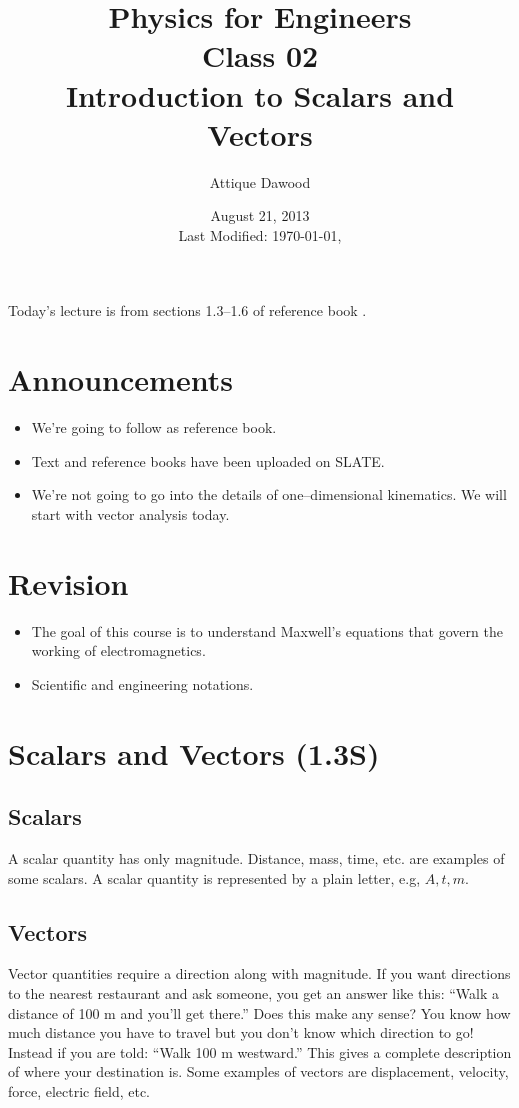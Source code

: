 \documentclass[12pt,a4paper]{article}
\title{\vspace{-2cm}Physics for Engineers\\Class 02\\Introduction to Scalars and Vectors}
\author{Attique Dawood}
\date{August 21, 2013\\[0.2cm] Last Modified: \today, \currenttime}
\begin{document}
\maketitle
Today's lecture is from sections 1.3--1.6 of reference book \cite{Sadiku}.
\section{Announcements}
\begin{itemize}
\item We're going to follow \cite{Sadiku} as reference book.
\item Text and reference books have been uploaded on SLATE.
\item We're not going to go into the details of one--dimensional kinematics. We will start with vector analysis today.
\end{itemize}
\section{Revision}
\begin{itemize}
\item The goal of this course is to understand Maxwell's equations that govern the working of electromagnetics.
\item Scientific and engineering notations.
\end{itemize}
\section{Scalars and Vectors (1.3S)}
\subsection{Scalars}
A scalar quantity has only magnitude. Distance, mass, time, etc. are examples of some scalars. A scalar quantity is represented by a plain letter, e.g, $A, t, m$.
\subsection{Vectors}
Vector quantities require a direction along with magnitude. If you want directions to the nearest restaurant and ask someone, you get an answer like this: ``Walk a distance of 100 m and you'll get there.'' Does this make any sense? You know how much distance you have to travel but you don't know which direction to go! Instead if you are told: ``Walk 100 m westward.'' This gives a complete description of where your destination is. Some examples of vectors are displacement, velocity, force, electric field, etc.
\end{document}
